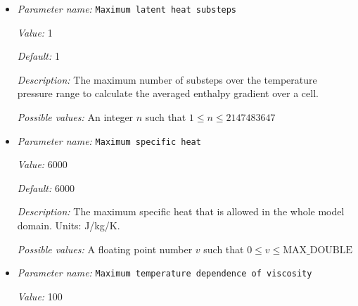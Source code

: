 \begin{itemize}
{\it Value:} pyr-ringwood88.txt


{\it Default:} pyr-ringwood88.txt


{\it Description:} The file names of the material data. List with as many components as active compositional fields (material data is assumed to be in order with the ordering of the fields). 


{\it Possible values:} A list of 0 to 4294967295 elements where each element is [Any string]
\item {\it Parameter name:} {\tt Maximum latent heat substeps}
\label{parameters:Material model/Grain size model/Maximum latent heat substeps}
\label{parameters:Material_20model/Grain_20size_20model/Maximum_20latent_20heat_20substeps}


{\it Value:} 1


{\it Default:} 1


{\it Description:} The maximum number of substeps over the temperature pressure range to calculate the averaged enthalpy gradient over a cell.


{\it Possible values:} An integer $n$ such that $1\leq n \leq 2147483647$
\item {\it Parameter name:} {\tt Maximum specific heat}
\label{parameters:Material model/Grain size model/Maximum specific heat}
\label{parameters:Material_20model/Grain_20size_20model/Maximum_20specific_20heat}


{\it Value:} 6000


{\it Default:} 6000


{\it Description:} The maximum specific heat that is allowed in the whole model domain. Units: J/kg/K.


{\it Possible values:} A floating point number $v$ such that $0 \leq v \leq \text{MAX\_DOUBLE}$
\item {\it Parameter name:} {\tt Maximum temperature dependence of viscosity}
\label{parameters:Material model/Grain size model/Maximum temperature dependence of viscosity}
\label{parameters:Material_20model/Grain_20size_20model/Maximum_20temperature_20dependence_20of_20viscosity}


{\it Value:} 100



\end{itemize}
